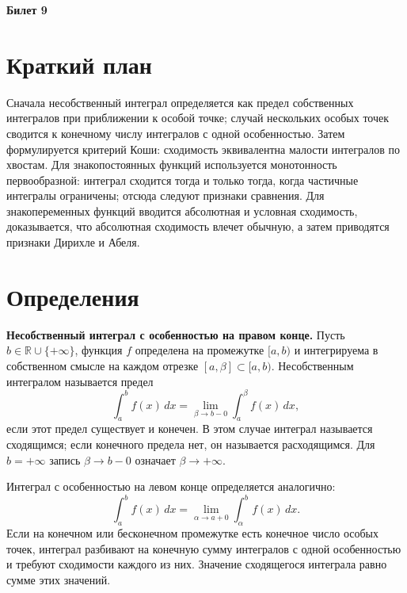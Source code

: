 \documentclass[12pt,a4paper]{article}
\newcommand{\R}{\mathbb{R}}
\newcommand{\dd}{\,d}
\begin{document}
\begin{center}
{\Large\bfseries Билет 9}
\end{center}

\noindent{}

\section*{Краткий план}

Сначала несобственный интеграл определяется как предел собственных интегралов
при приближении к особой точке; случай нескольких особых точек сводится к
конечному числу интегралов с одной особенностью. Затем формулируется критерий
Коши: сходимость эквивалентна малости интегралов по хвостам. Для
знакопостоянных функций используется монотонность первообразной: интеграл
сходится тогда и только тогда, когда частичные интегралы ограничены; отсюда
следуют признаки сравнения. Для знакопеременных функций вводится абсолютная и
условная сходимость, доказывается, что абсолютная сходимость влечет обычную, а
затем приводятся признаки Дирихле и Абеля.

\section*{Определения}

\textbf{Несобственный интеграл с особенностью на правом конце.}
Пусть \(b\in\R\cup\{+\infty\}\), функция \(f\) определена на промежутке
\([a,b)\) и интегрируема в собственном смысле на каждом отрезке
\([a,\beta]\subset [a,b)\). Несобственным интегралом называется предел
\[
  \int_a^b f(x)\dd x
  =
  \lim_{\beta\to b-0}\int_a^\beta f(x)\dd x,
\]
если этот предел существует и конечен. В этом случае интеграл называется
сходящимся; если конечного предела нет, он называется расходящимся.
Для \(b=+\infty\) запись \(\beta\to b-0\) означает \(\beta\to+\infty\).

Интеграл с особенностью на левом конце определяется аналогично:
\[
  \int_a^b f(x)\dd x
  =
  \lim_{\alpha\to a+0}\int_\alpha^b f(x)\dd x.
\]
Если на конечном или бесконечном промежутке есть конечное число особых точек,
интеграл разбивают на конечную сумму интегралов с одной особенностью и требуют
сходимости каждого из них. Значение сходящегося интеграла равно сумме этих
значений.
\end{document}
